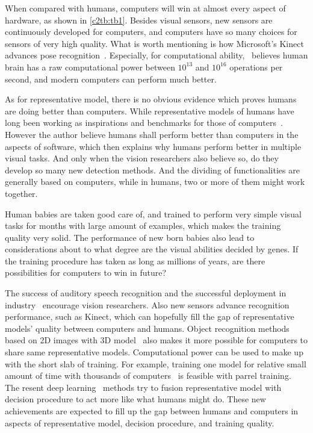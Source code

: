 When compared with humans, computers will win at almost every aspect of hardware, as shown in \ref{c2tb:tb1}. Besides visual sensors, new sensors are continuously developed for computers, and computers have so many choices for sensors of very high quality. What is worth mentioning is how Microsoft's Kinect advances pose recognition~\citep{knct}. Especially, for computational ability,~\citep{bpw} believes human brain has a raw computational power between $10^{13}$ and $10^{16}$ operations per second, and modern computers can perform much better.

 As for representative model, there is no obvious evidence which proves humans are doing better than computers. While representative models of humans have long been working as inspirations and benchmarks for those of computers~\citep{rbm}. However the author believe humans shall perform better than computers in the aspects of software, which then explains why humans perform better in multiple visual tasks. And only when the vision researchers also believe so, do they develop  so many new detection methods. And the  dividing of functionalities  are generally based on computers, while in humans, two or more of them might work together.

Human babies are taken good care of, and trained to perform very simple visual tasks for months with large amount of examples, which makes the training quality very solid. The performance of new born babies also lead to considerations about to what degree are the visual abilities decided by genes. If the training procedure has taken as long as millions of years, are there possibilities for computers to win in future?

The success of auditory speech recognition and the successful deployment in industry~\citep{siri} encourage vision researchers. Also new sensors advance recognition performance, such as Kinect, which can hopefully fill the gap of representative models' quality between computers and humans. Object recognition methods based on 2D images with 3D model~\citep{r3d} also makes it more possible for computers to share same representative models.  Computational power can be used to make up with the short slab of training. For example, training one model for relative small amount of time with thousands of computers~\citep{dnnnn} is feasible with parrel training. The resent deep learning~\citep{dlearn} methods try to fusion representative model with decision procedure to act more like what humans might do. These new achievements are expected to fill up the gap between humans and computers in aspects of representative model, decision procedure, and training quality.



